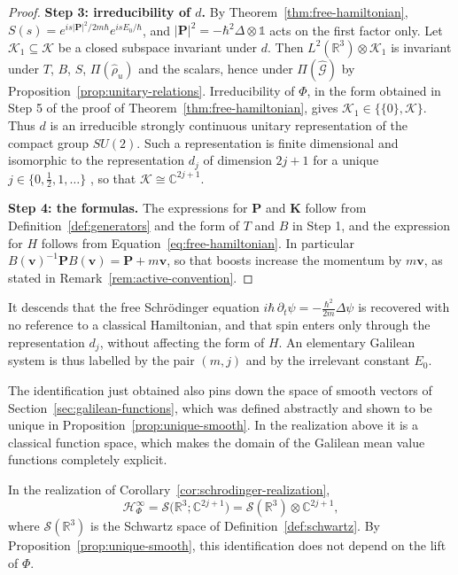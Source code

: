 \begin{proof}
	\medskip
	\noindent\textbf{Step 3: irreducibility of $d$.} By Theorem~\ref{thm:free-hamiltonian}, $S(s)=e^{is|\mathbf{P}|^2/2m\hbar}e^{isE_0/\hbar}$, and $|\mathbf{P}|^2=-\hbar^2\Delta\otimes\mathbb{1}$ acts on the first factor only. Let $\mathcal{K}_1\subseteq\mathcal{K}$ be a closed subspace invariant under $d$. Then $L^2(\mathbb{R}^3)\otimes\mathcal{K}_1$ is invariant under $T$, $B$, $S$, $\Pi(\hat\rho_u)$ and the scalars, hence under $\Pi(\widehat{\mathcal{G}})$ by Proposition~\ref{prop:unitary-relations}. Irreducibility of $\Phi$, in the form obtained in Step 5 of the proof of Theorem~\ref{thm:free-hamiltonian}, gives $\mathcal{K}_1\in\{\{0\},\mathcal{K}\}$. Thus $d$ is an irreducible strongly continuous unitary representation of the compact group $SU(2)$. Such a representation is finite dimensional and isomorphic to the representation $d_j$ of dimension $2j+1$ for a unique $j\in\{0,\tfrac{1}{2},1,\dots\}$ \cite[TODO-location]{TODO-Hal03}, so that $\mathcal{K}\cong\mathbb{C}^{2j+1}$.
	
	\medskip
	\noindent\textbf{Step 4: the formulas.} The expressions for $\mathbf{P}$ and $\mathbf{K}$ follow from Definition~\ref{def:generators} and the form of $T$ and $B$ in Step 1, and the expression for $H$ follows from Equation~\eqref{eq:free-hamiltonian}. In particular $B(\mathbf{v})^{-1}\mathbf{P}B(\mathbf{v})=\mathbf{P}+m\mathbf{v}$, so that boosts increase the momentum by $m\mathbf{v}$, as stated in Remark~\ref{rem:active-convention}.
\end{proof}

\noindent It descends that the free Schrödinger equation $i\hbar\,\partial_t\psi=-\tfrac{\hbar^2}{2m}\Delta\psi$ is recovered with no reference to a classical Hamiltonian, and that spin enters only through the representation $d_j$, without affecting the form of $H$. An elementary Galilean system is thus labelled by the pair $(m,j)$ and by the irrelevant constant $E_0$.

The identification just obtained also pins down the space of smooth vectors of Section~\ref{sec:galilean-functions}, which was defined abstractly and shown to be unique in Proposition~\ref{prop:unique-smooth}. In the realization above it is a classical function space, which makes the domain of the Galilean mean value functions completely explicit.

\begin{proposition}\label{prop:smooth-schwartz}
	In the realization of Corollary~\ref{cor:schrodinger-realization},
	\begin{equation*}
		\mathcal{H}^\infty_\Phi=\mathcal{S}\big(\mathbb{R}^3;\mathbb{C}^{2j+1}\big)=\mathcal{S}(\mathbb{R}^3)\otimes\mathbb{C}^{2j+1},
	\end{equation*}
	where $\mathcal{S}(\mathbb{R}^3)$ is the Schwartz space of Definition~\ref{def:schwartz}. By Proposition~\ref{prop:unique-smooth}, this identification does not depend on the lift of $\Phi$.
\end{proposition}


